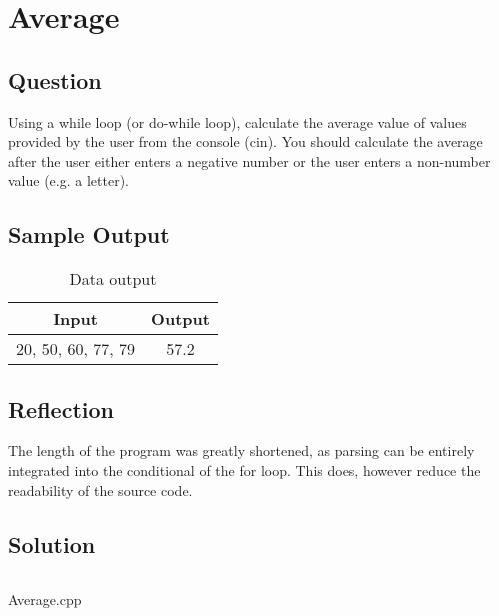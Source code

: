 \section{Average}
    \subsection*{Question}
    Using a while loop (or do-while loop), calculate the average value of values provided by the user from the console (cin).
    You should calculate the average after the user either enters a negative number or the user enters a non-number value (e.g. a letter).
        
    \subsection*{Sample Output}
        \begin{table}[H]
            \centering
            \begin{tabular}{c c}
                \hline
                \textbf{Input} & \textbf{Output} \\
                \hline
                20, 50, 60, 77, 79 & 57.2 \\
                \hline
            \end{tabular}
            \caption{Data output}
        \end{table}

    \subsection*{Reflection}
        The length of the program was greatly shortened, as parsing can
        be entirely integrated into the conditional of the for loop.
        This does, however reduce the readability of the source code.
        
    \subsection*{Solution}
        \begin{listing}[H]
            \inputminted{cpp}{../Tasks/06-Average/Average.cpp}%
            \caption{Average.cpp}
        \end{listing}